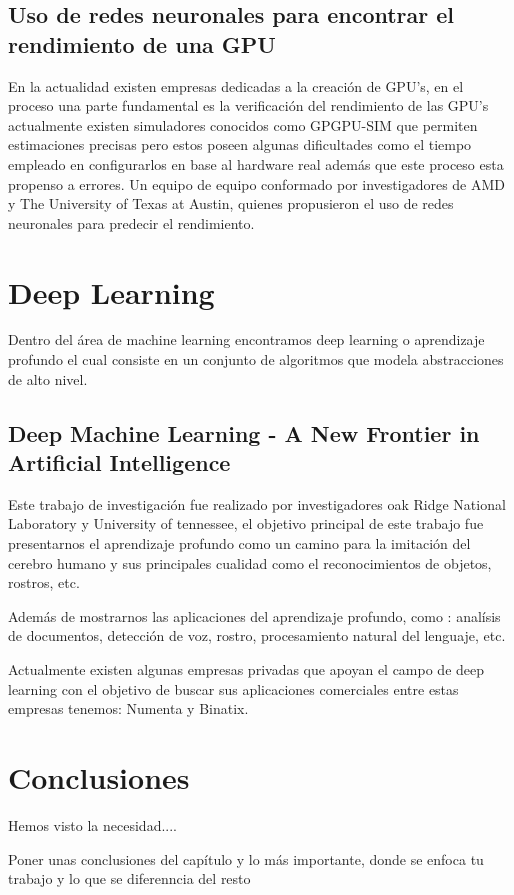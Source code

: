 \subsection{Uso de redes neuronales para encontrar el rendimiento de una GPU}
En la actualidad existen empresas dedicadas a la creación de GPU's, en el proceso una parte fundamental es la verificación del rendimiento de las GPU's actualmente existen simuladores conocidos como GPGPU-SIM que permiten estimaciones precisas pero estos poseen algunas dificultades como el tiempo empleado en configurarlos en base al hardware real además que este proceso esta propenso a errores. Un equipo de equipo conformado por investigadores de AMD y The University of Texas at Austin, quienes propusieron el uso de redes neuronales para predecir el rendimiento.
\section{Deep Learning}
Dentro del área de machine learning  encontramos deep learning o aprendizaje profundo el cual consiste en un conjunto de algoritmos que modela abstracciones de alto nivel.

\subsection{Deep Machine Learning - A New Frontier in Artificial Intelligence}
Este trabajo de investigación fue realizado por investigadores oak Ridge National Laboratory y University of tennessee, el objetivo principal de este trabajo fue presentarnos el aprendizaje profundo como un camino para la imitación del cerebro humano y sus principales cualidad como el reconocimientos de objetos, rostros, etc.

Además de mostrarnos las aplicaciones del aprendizaje profundo, como : analísis de documentos, detección de voz, rostro, procesamiento natural del lenguaje, etc.

Actualmente existen algunas empresas privadas que apoyan el campo de deep learning con el objetivo de buscar sus aplicaciones comerciales entre estas empresas tenemos: Numenta y Binatix.

\section{Conclusiones}
Hemos visto la necesidad....

Poner unas conclusiones del capítulo y lo más importante, donde se enfoca tu trabajo y lo que se diferenncia del resto

